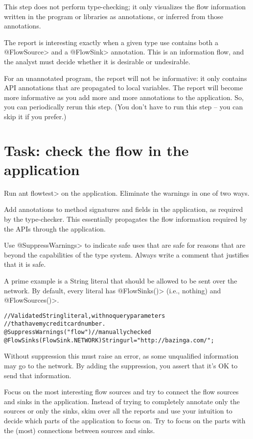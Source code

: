 This step does not perform type-checking; it only visualizes the flow
information written in the program or libraries as annotations, or
inferred from those annotations.

The report is interesting exactly when a given type use contains both
a \<@FlowSource> and a \<@FlowSink> annotation. This is an information flow,
and the analyst must decide whether it is desirable or undesirable.

For an unannotated program, the report will not be informative: it
only contains API annotations that are propagated to local
variables. The report will become more informative as you add more and
more annotations to the application. So, you can periodically rerun
this step. (You don't have to run this step -- you can skip it if you
prefer.)


\section{Task: check the flow in the application}

Run \<ant flowtest> on the application.
Eliminate the warnings in one of two ways.

Add annotations to method signatures and fields in the application, as
required by the type-checker. This essentially propagates the flow
information required by the APIs through the application.

Use \<@SuppressWarnings> to indicate safe uses that are safe for reasons
that are beyond the capabilities of the type system. Always write a
comment that justifies that it is safe.

A prime example is a String literal that should be allowed to be sent
over the network. By default, every literal has \<@FlowSinks()>
(i.e., nothing) and \<@FlowSources()>.

\begin{alltt}
    // Validated String literal, with no query parameters
    // that have my credit card number.
    @SuppressWarnings("flow") // manually checked
    @FlowSinks(FlowSink.NETWORK) String url = "http://bazinga.com/";
\end{alltt}

Without suppression this must raise an error, as some unqualified
information may go to the network. By adding the suppression, you
assert that it's OK to send that information.

Focus on the most interesting flow sources and try to connect the flow
sources and sinks in the application. Instead of trying to completely
annotate only the sources or only the sinks, skim over all the reports
and use your intuition to decide which parts of the application to
focus on. Try to focus on the parts with the (most) connections
between sources and sinks.

